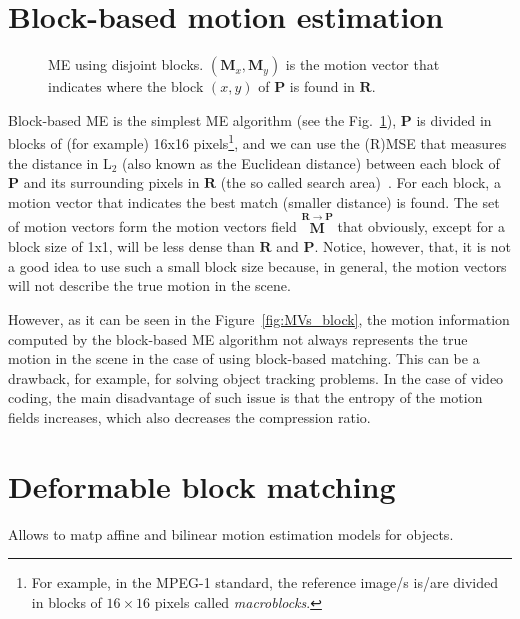 

\section{Block-based motion estimation~\cite{rao1996techniques}}

\begin{figure}
  \centering
  \caption{ME using disjoint blocks. $({\mathbf M}_x, {\mathbf M}_y)$
    is the motion vector that indicates where the block $(x,y)$ of
    ${\mathbf P}$ is found in ${\mathbf R}$.}
  \label{fig:simple}
\end{figure}

Block-based ME is the simplest ME algorithm (see the
Fig.~\ref{fig:simple}), ${\mathbf P}$ is divided in blocks of (for
example) 16x16 pixels\footnote{For example, in the MPEG-1 standard,
  the reference image/s is/are divided in blocks of $16\times 16$
  pixels called \emph{macroblocks}.}, and we can use the (R)MSE that
measures the distance in L$_2$ (also known as the Euclidean distance)
between each block of ${\mathbf P}$ and its surrounding pixels in
${\mathbf R}$ (the so called search area)~\cite{zhu2000new}. For each
block, a motion vector that indicates the best match (smaller
distance) is found. The set of motion vectors form the motion vectors
field $\overset{{\mathbf R}\rightarrow {\mathbf P}}{\mathbf M}$ that
obviously, except for a block size of 1x1, will be less dense than
${\mathbf R}$ and ${\mathbf P}$. Notice, however, that, it is not a
good idea to use such a small block size because, in general, the
motion vectors will not describe the true motion in the scene.

However, as it can be seen in the Figure~\ref{fig:MVs_block}, the
motion information computed by the block-based ME algorithm not always
represents the true motion in the scene in the case of using
block-based matching. This can be a drawback, for example, for solving
object tracking problems. In the case of video coding, the main
disadvantage of such issue is that the entropy of the motion fields
increases, which also decreases the compression ratio.


\section{Deformable block matching}

Allows to matp affine and bilinear motion estimation models for
objects.

